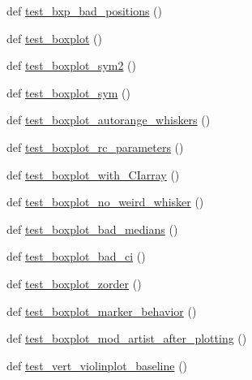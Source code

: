 \begin{DoxyCompactItemize}
\item 
def \hyperlink{namespacematplotlib_1_1tests_1_1test__axes_a5c3cd762991e6c27c263901a6bc62abd}{test\+\_\+bxp\+\_\+bad\+\_\+positions} ()
\item 
def \hyperlink{namespacematplotlib_1_1tests_1_1test__axes_abe19ddf06c29973da7a2fe65c42ac242}{test\+\_\+boxplot} ()
\item 
def \hyperlink{namespacematplotlib_1_1tests_1_1test__axes_af77d0ebf4fef29ec1b11292b1dac4e5e}{test\+\_\+boxplot\+\_\+sym2} ()
\item 
def \hyperlink{namespacematplotlib_1_1tests_1_1test__axes_ab6426491e5e32faafb25989f816b3263}{test\+\_\+boxplot\+\_\+sym} ()
\item 
def \hyperlink{namespacematplotlib_1_1tests_1_1test__axes_add3a3041763f485845f62493630aa691}{test\+\_\+boxplot\+\_\+autorange\+\_\+whiskers} ()
\item 
def \hyperlink{namespacematplotlib_1_1tests_1_1test__axes_a3970dc6366f3b80407082376835299be}{test\+\_\+boxplot\+\_\+rc\+\_\+parameters} ()
\item 
def \hyperlink{namespacematplotlib_1_1tests_1_1test__axes_a5b9bb73adcc4a6099e9325cc69051acf}{test\+\_\+boxplot\+\_\+with\+\_\+\+C\+Iarray} ()
\item 
def \hyperlink{namespacematplotlib_1_1tests_1_1test__axes_a8d605d3e7af805585440bb4c0bdce84f}{test\+\_\+boxplot\+\_\+no\+\_\+weird\+\_\+whisker} ()
\item 
def \hyperlink{namespacematplotlib_1_1tests_1_1test__axes_a7e9aa28bbb21fb5d71c4b095562b4517}{test\+\_\+boxplot\+\_\+bad\+\_\+medians} ()
\item 
def \hyperlink{namespacematplotlib_1_1tests_1_1test__axes_a393f7f69ad12f707e7ce0bbaa2b2cc1c}{test\+\_\+boxplot\+\_\+bad\+\_\+ci} ()
\item 
def \hyperlink{namespacematplotlib_1_1tests_1_1test__axes_ad4fbd2de88ffbbf93e3982cb3b1f1fdb}{test\+\_\+boxplot\+\_\+zorder} ()
\item 
def \hyperlink{namespacematplotlib_1_1tests_1_1test__axes_a2f9fa8ab48863e33c0ef4bac82f682a2}{test\+\_\+boxplot\+\_\+marker\+\_\+behavior} ()
\item 
def \hyperlink{namespacematplotlib_1_1tests_1_1test__axes_a84f41e3f0166b45dfb52249efd0dc49d}{test\+\_\+boxplot\+\_\+mod\+\_\+artist\+\_\+after\+\_\+plotting} ()
\item 
def \hyperlink{namespacematplotlib_1_1tests_1_1test__axes_a6302588e624cbdc1c9b924db81724cb1}{test\+\_\+vert\+\_\+violinplot\+\_\+baseline} ()
\item 

\end{DoxyCompactItemize}
